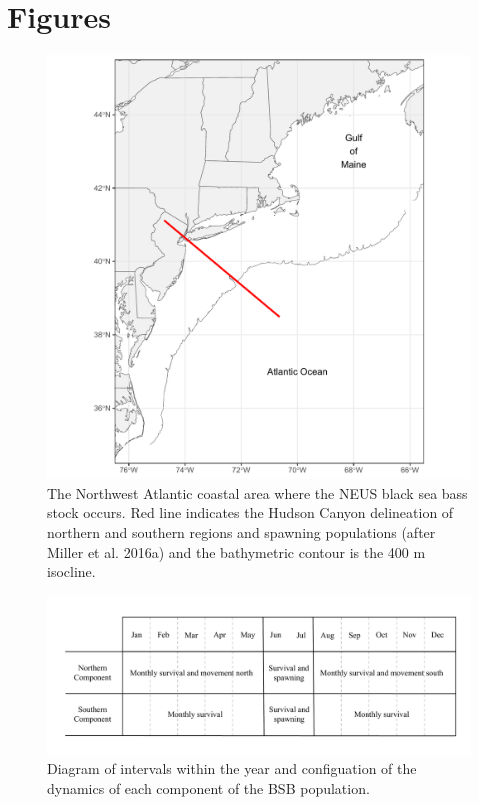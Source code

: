 \documentclass[
]{article}
\begin{document}
\pagebreak

\pagebreak

\hypertarget{figures}{%
\section*{Figures}\label{figures}}



\begin{figure}

{\centering \includegraphics[width=1\linewidth]{map} 

}

\caption{The Northwest Atlantic coastal area where the NEUS black sea bass stock occurs. Red line indicates the Hudson Canyon delineation of northern and southern regions and spawning populations (after Miller et al. 2016a) and the bathymetric contour is the 400 m isocline.}\label{fig:map}
\end{figure}
\pagebreak

\begin{figure}

{\centering \includegraphics[width=0.8\linewidth]{bsb_movement_diagram} 

}

\caption{Diagram of intervals within the year and configuation of the dynamics of each component of the BSB population.}\label{fig:migration-diagram}
\end{figure}
\pagebreak
\end{document}
